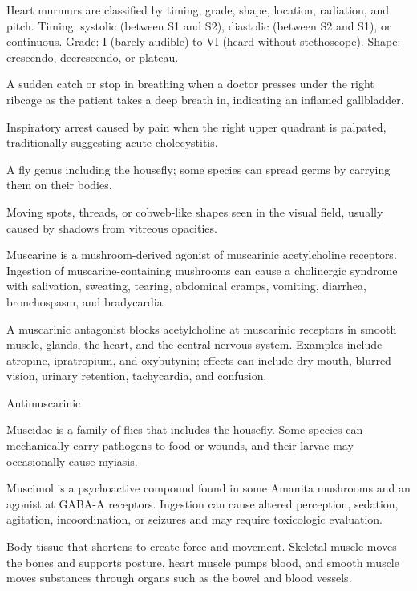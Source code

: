  Heart murmurs are classified by timing, grade, shape, location, radiation, and pitch.
Timing: systolic (between S1 and S2), diastolic (between S2 and S1), or continuous.
Grade: I (barely audible) to VI (heard without stethoscope). Shape: crescendo,
decrescendo, or plateau.

 A sudden catch or stop in breathing when a doctor presses under the right ribcage as the patient takes a deep breath in, indicating an inflamed gallbladder.

 Inspiratory arrest caused by pain when the right upper quadrant is palpated, traditionally suggesting acute cholecystitis.

 A fly genus including the housefly; some species can spread germs by carrying them on their bodies.

 Moving spots, threads, or cobweb-like shapes seen in the visual field, usually caused by shadows from vitreous opacities.

 Muscarine is a mushroom-derived agonist of muscarinic acetylcholine receptors. Ingestion of muscarine-containing mushrooms can cause a cholinergic syndrome with salivation, sweating, tearing, abdominal cramps, vomiting, diarrhea, bronchospasm, and bradycardia.

 A muscarinic antagonist blocks acetylcholine at muscarinic receptors in smooth muscle, glands, the heart, and the central nervous system. Examples include atropine, ipratropium, and oxybutynin; effects can include dry mouth, blurred vision, urinary retention, tachycardia, and confusion.

\synonyms
Antimuscarinic

 Muscidae is a family of flies that includes the housefly. Some species can mechanically carry pathogens to food or wounds, and their larvae may occasionally cause myiasis.

 Muscimol is a psychoactive compound found in some Amanita mushrooms and an agonist at GABA-A receptors. Ingestion can cause altered perception, sedation, agitation, incoordination, or seizures and may require toxicologic evaluation.

 Body tissue that shortens to create force and movement. Skeletal muscle moves the bones and supports posture, heart muscle pumps blood, and smooth muscle moves substances through organs such as the bowel and blood vessels.

